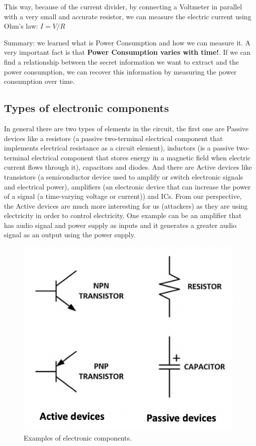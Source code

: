 This way, because of the current divider, by connecting a Voltmeter in parallel
with a very small and accurate resistor, we can measure the electric current
using Ohm's law: $I=V/R$
 
Summary: we learned what is Power Consumption and how we can measure it. A very
important fact is that \textbf{Power Consumption varies with time!}. If we can
find a relationship between the secret information we want to extract and the
power consumption, we can recover this information by measuring the power
consumption over time.

\subsection{Types of electronic components}

In general there are two types of elements in the circuit, the first one are
Passive devices like a resistors (a passive two-terminal electrical component
that implements electrical resistance as a circuit element), inductors (is a
passive two-terminal electrical component that stores energy in a magnetic field
when electric current flows through it), capacitors and diodes. And there are
Active devices like transistors (a semiconductor device used to amplify or
switch electronic signals and electrical power), amplifiers (an electronic
device that can increase the power of a signal (a time-varying voltage or
current)) and ICs. From our perspective, the Active devices are much more
interesting for us (attackers) as they are using electricity in order to control
electricity. One example can be an amplifier that has audio signal and power
supply as inputs and it generates a greater audio signal as an output using the
power supply. 

\begin{figure}[!ht]
	\centering
	\includegraphics{images/type_of_electronic_components.png}
	\caption{Examples of electronic components.} \label{fig:type_of_electronic_components}
\end{figure}

